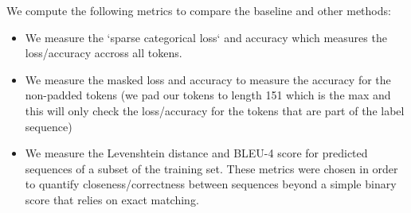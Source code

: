 \documentclass{article}
\begin{document}
We compute the following metrics to compare the baseline and other methods:

\begin{itemize}
  \item We measure the `sparse categorical loss` and accuracy which measures the loss/accuracy accross all tokens. 
  \item We measure the masked loss and accuracy to measure the accuracy for the non-padded tokens (we pad our tokens to length 151 which is the max and this will only check the loss/accuracy for the tokens that are part of the label sequence)
  \item We measure the Levenshtein distance and BLEU-4 score for predicted sequences of a subset of the training set. These metrics were chosen in order to quantify closeness/correctness between sequences beyond a simple binary score that relies on exact matching.
\end{itemize}
\end{document}
